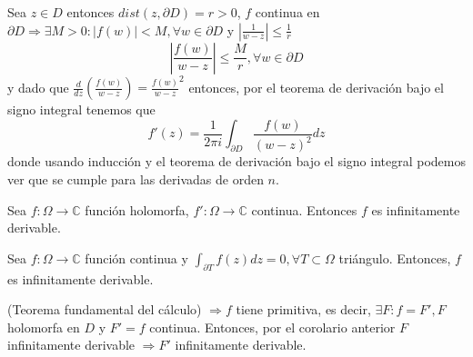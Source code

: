 \begin{dem}
  Sea $z \in D$ entonces $dist (z, \partial D) = r > 0$, $f$ continua en $\partial D \Rightarrow \exists M>0 : | f(w) | < M, \forall w \in \partial D$ y $| \frac{1}{w - z} | \leq \frac{1}{r} $
  \[ 
    | \frac{f(w)}{w-z} |  \leq \frac{M}{r}, \forall w \in \partial D
  \] 
  y dado que $\frac{d{}}{d{z}}(\frac{f(w)}{w -z}) = \frac{f(w)}{w-z}^2$ entonces, por el teorema de derivación bajo el signo integral tenemos que
  \[ 
    f'(z) = \frac{1}{2 \pi i} \int_{\partial D}^{} \frac{f(w)}{(w-z)^2} dz
  \] 
  donde usando inducción y el teorema de derivación bajo el signo integral podemos ver que se cumple para las derivadas de orden $n$.
\end{dem}

\begin{cor}
  Sea $f: \Omega \to \mathbb{C}$ función holomorfa, $f': \Omega \to \mathbb{C}$ continua. Entonces $f$ es infinitamente derivable.
\end{cor}

\begin{theo}[Morera]
  Sea $f: \Omega \to \mathbb{C}$ función continua y $\int_{\partial T}^{} f(z) dz = 0, \forall T \subset \Omega$ triángulo. Entonces, $f$ es infinitamente derivable.
\end{theo}

\begin{dem}
  (Teorema fundamental del cálculo) $\Rightarrow f$ tiene primitiva, es decir, $\exists F: f = F', F$ holomorfa en $D$ y $F' = f$  continua. Entonces, por el corolario anterior $F$ infinitamente derivable $\Rightarrow F'$ infinitamente derivable.
\end{dem}
